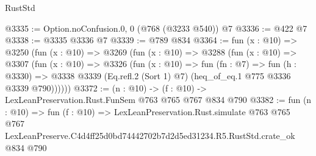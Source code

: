 \begin{lexlean}{RustStd}
\begin{coremodule}
@3335 := Option.noConfusion.{0, 0} (@768 (@3233 @540)) @7
@3336 := @422 @7
@3338 := @3335 @3336 @7
@3339 := @789 @834
@3364 := fun (x : @10) =>
  @3250
    (fun (x : @10) =>
    @3269
      (fun (x : @10) =>
      @3288
        (fun (x : @10) =>
        @3307
          (fun (x : @10) =>
          @3326
            (fun (x : @10) =>
            fun (fn : @7) =>
            fun (h : @3330) =>
            @3338 @3339 (Eq.refl.{2} (Sort 1) @7) (heq_of_eq.{1} @775 @3336 @3339 @790))))))
@3372 := (n : @10) -> (f : @10) -> LexLeanPreservation.Rust.FunSem @763 @765 @767 @834 @790
@3382 := fun (n : @10) =>
  fun (f : @10) =>
  LexLeanPreservation.Rust.simulate
    @763
    @765
    @767
    LexLeanPreserve.C4d4ff25d0bd74442702b7d2d5ed31234.R5.RustStd.crate_ok
    @834
    @790
\end{coremodule}
\end{lexlean}
